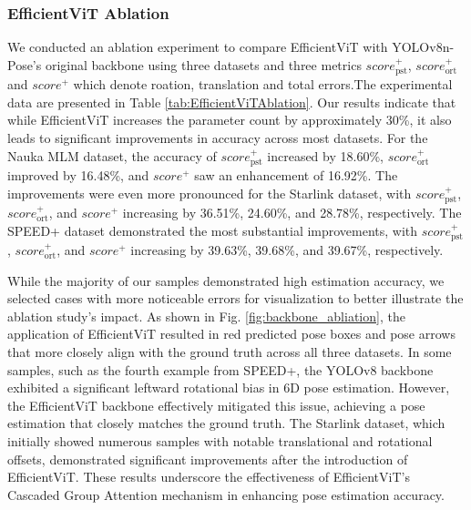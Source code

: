 \documentclass[a4paper,fleqn]{cas-sc}
\begin{document}
\subsubsection{EfficientViT Ablation}
We conducted an ablation experiment to compare EfficientViT with YOLOv8n-Pose's original backbone using three datasets and three metrics $score_{\text{pst}}^+$,  $score_{\text{ort}}^+$ and $score^+$ which denote roation, translation and total errors.The experimental data are presented in Table \ref{tab:EfficientViTAblation}. Our results indicate that while EfficientViT increases the parameter count by approximately 30\%, it also leads to significant improvements in accuracy across most datasets.
For the Nauka MLM dataset, the accuracy of $score_{\text{pst}}^+$ increased by 18.60\%, $score_{\text{ort}}^+$ improved by 16.48\%, and $score^+$ saw an enhancement of 16.92\%. The improvements were even more pronounced for the Starlink dataset, with $score_{\text{pst}}^+$, $score_{\text{ort}}^+$, and $score^+$ increasing by 36.51\%, 24.60\%, and 28.78\%, respectively. The SPEED+ dataset demonstrated the most substantial improvements, with $score_{\text{pst}}^+$, $score_{\text{ort}}^+$, and $score^+$ increasing by 39.63\%, 39.68\%, and 39.67\%, respectively.

While the majority of our samples demonstrated high estimation accuracy, we selected cases with more noticeable errors for visualization to better illustrate the ablation study's impact. As shown in Fig. \ref{fig:backbone_abliation}, the application of EfficientViT resulted in red predicted pose boxes and pose arrows that more closely align with the ground truth across all three datasets. In some samples, such as the fourth example from SPEED+, the YOLOv8 backbone exhibited a significant leftward rotational bias in 6D pose estimation. However, the EfficientViT backbone effectively mitigated this issue, achieving a pose estimation that closely matches the ground truth.
The Starlink dataset, which initially showed numerous samples with notable translational and rotational offsets, demonstrated significant improvements after the introduction of EfficientViT. These results underscore the effectiveness of EfficientViT's Cascaded Group Attention mechanism in enhancing pose estimation accuracy.
\end{document}
